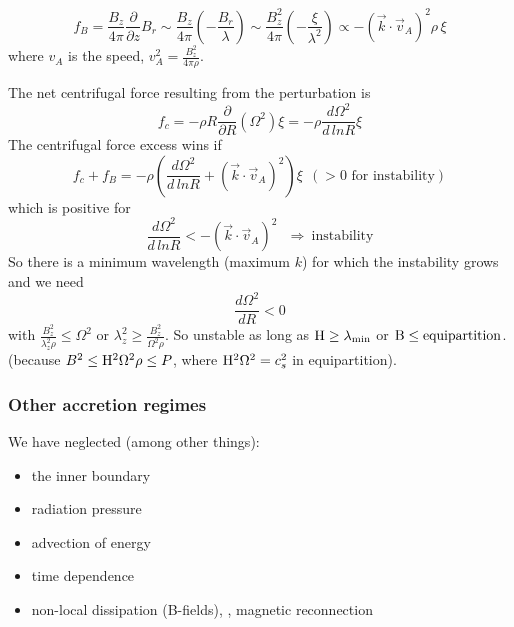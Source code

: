 \begin{enumerate}[a)]
\begin{equation}
   f_{B} = \frac{B_{z}}{4\pi}\frac{\partial}{\partial z}B_{r} \sim \frac{B_{z}}{4\pi}\left( - \frac{B_{r}}{\lambda} \right)
        \sim \frac{B_{z}^2}{4\pi}\left( - \frac{\xi}{\lambda^2} \right) \propto - \left( \vec{k}\cdot\vec{v}_{A} \right)^2 \rho\,\xi
\end{equation}
where $v_{A}$ is the \alfven speed, $v_{A}^2 = \frac{B_{z}^2}{4\pi\rho}$.
 
The net centrifugal force resulting from the perturbation is
\begin{equation}
   f_{c} = -\rho R \frac{\partial}{\partial R}(\Omega^{2})\xi = -\rho \frac{d\Omega^{2}}{d\,lnR}\xi
\end{equation}
The centrifugal force excess wins if
\begin{equation}
   f_{c}+f_{B} = -\rho \left( \frac{d \Omega^{2}}{d\,lnR} + \left( \vec{k}\cdot\vec{v}_{A}\right)^2 \right)\xi ~~ (>0\textrm{~for instability})
\end{equation}
which is positive for
\begin{equation}
    \frac{d \Omega^{2}}{d\,lnR} < - \left( \vec{k}\cdot\vec{v}_{A}\right)^2  ~~~ \Rightarrow ~ \textrm{instability}
\end{equation}
So there is a minimum wavelength (maximum $k$) for which the instability grows and we need
\begin{equation}
   \frac{d\Omega^{2}}{dR} < 0 
\end{equation}
with $\frac{B_{z}^{2}}{\lambda_{z}^{2}\rho} \le \Omega^{2}$ or $\lambda_{z}^2 \ge \frac{B_{z}^{2}}{\Omega^{2}\rho}$.
So unstable as long as ${\rm H} \ge \lambda_{\rm min}$ or ${\rm B} \le \textrm{equipartition}$.
(because $B^{2} \le {\rm H}^{2} \Omega^{2}\rho \le P$, where ${\rm H}^{2}\Omega^{2}=c_{s}^2$ in equipartition).

\end{enumerate}

\subsubsection{Other accretion regimes}

\noi We have neglected (among other things):

\begin{itemize}
   \item the inner boundary
   \item radiation pressure
   \item advection of energy
   \item time dependence
   \item non-local dissipation (B-fields), \ie, magnetic reconnection
\end{itemize}

